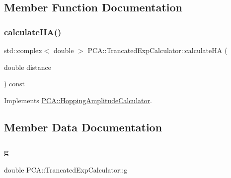 \subsection{Member Function Documentation}
\hypertarget{class_p_c_a_1_1_trancated_exp_calculator_afe48461b23fd2b0d350f32bdac0c3d18}{}\label{class_p_c_a_1_1_trancated_exp_calculator_afe48461b23fd2b0d350f32bdac0c3d18} 
\subsubsection{\texorpdfstring{calculate\+H\+A()}{calculateHA()}}
{\footnotesize\ttfamily std\+::complex$<$ double $>$ P\+C\+A\+::\+Trancated\+Exp\+Calculator\+::calculate\+HA (\begin{DoxyParamCaption}\item[{double}]{distance }\end{DoxyParamCaption}) const\hspace{0.3cm}{\ttfamily [virtual]}}



Implements \hyperlink{class_p_c_a_1_1_hopping_amplitude_calculator_ae925735be8ef006f3f8dfdc1a23cae89}{P\+C\+A\+::\+Hopping\+Amplitude\+Calculator}.



\subsection{Member Data Documentation}
\hypertarget{class_p_c_a_1_1_trancated_exp_calculator_ade1e4dd2be1b5ec6f6e38cc1a251a719}{}\label{class_p_c_a_1_1_trancated_exp_calculator_ade1e4dd2be1b5ec6f6e38cc1a251a719} 
\subsubsection{\texorpdfstring{g}{g}}
{\footnotesize\ttfamily double P\+C\+A\+::\+Trancated\+Exp\+Calculator\+::g\hspace{0.3cm}{\ttfamily [private]}}

\hypertarget{class_p_c_a_1_1_trancated_exp_calculator_a3d26a4f32c4d4e1ff068cb58446f029d}{}\label{class_p_c_a_1_1_trancated_exp_calculator_a3d26a4f32c4d4e1ff068cb58446f029d} 
